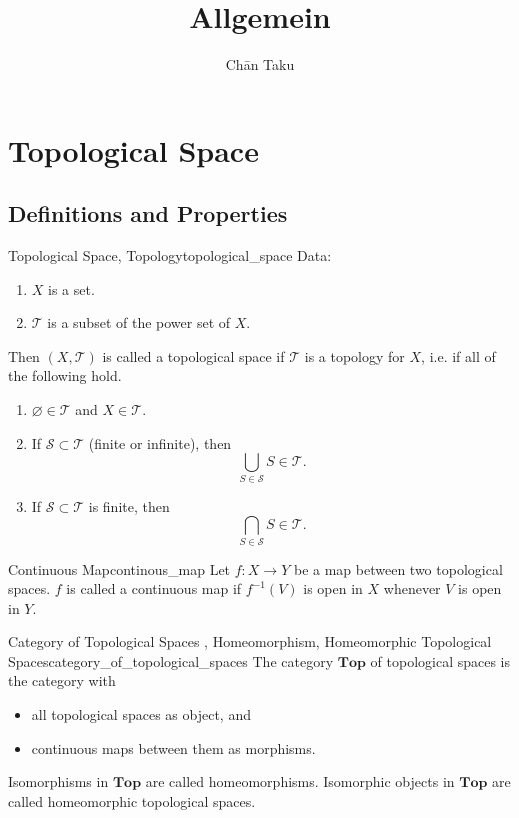 \documentclass{article}
\title{Allgemein}
\author{Ch\=an Taku}
\begin{document}
\maketitle

\section{Topological Space}

\subsection{Definitions and Properties}

\begin{definition}{Topological Space, Topology}{topological_space}
    Data:
    \begin{enumerate}
        \item $X$ is a set.
        \item $\mathcal{T}$ is a subset of the power set of $X$.
    \end{enumerate}
    Then $(X,\mathcal{T})$ is called a topological space if $\mathcal{T}$ is a topology for $X$, i.e. if all of the following hold.
    \begin{enumerate}
        \item $\varnothing \in \mathcal{T}$ and $X\in\mathcal{T}$.
        \item If $\mathcal{S}\subset \mathcal{T}$ (finite or infinite), then
        \[ \bigcup_{S\in\mathcal{S}} S \in \mathcal{T}. \]
        \item If $\mathcal{S}\subset \mathcal{T}$ is finite, then
        \[ \bigcap_{S\in\mathcal{S}} S \in \mathcal{T}. \]
    \end{enumerate}
\end{definition}

\begin{definition}{Continuous Map}{continous_map}
    Let $f:X\rightarrow Y$ be a map between two topological spaces.
    $f$ is called a continuous map if $f^{-1}(V)$ is open in $X$ whenever $V$ is open in $Y$.
\end{definition}

\begin{definition}{Category of Topological Spaces \badge{\Cat}, Homeomorphism, Homeomorphic Topological Spaces}{category_of_topological_spaces}
    The category $\mathbf{Top}$ of topological spaces is the category with
    \begin{itemize}
        \item all topological spaces as object, and
        \item continuous maps between them as morphisms.
    \end{itemize}
    Isomorphisms in $\mathbf{Top}$ are called homeomorphisms.
    Isomorphic objects in $\mathbf{Top}$ are called homeomorphic topological spaces.
\end{definition}
\end{document}
